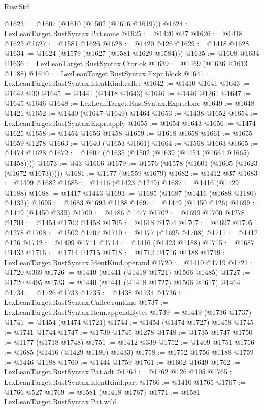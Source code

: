 \begin{lexlean}{RustStd}
\begin{coremodule}
@1623 := @1607 (@1610 (@1502 (@1616 @1619)))
@1624 := LexLeanTarget.RustSyntax.Pat.some
@1625 := @1420 @37
@1626 := @1418 @1625
@1627 := @1581 @1626
@1628 := @1420 @126
@1629 := @1418 @1628
@1634 := @1624 (@1579 (@1627 (@1581 @1629 @1584)))
@1635 := @1608 @1634
@1636 := LexLeanTarget.RustSyntax.Ctor.ok
@1639 := @1469 (@1636 @1613 @1188)
@1640 := LexLeanTarget.RustSyntax.Expr.block
@1641 := LexLeanTarget.RustSyntax.IdentKind.callee
@1642 := @1410 @1641
@1643 := @1642 @30
@1645 := @1441 (@1418 @1643)
@1646 := @1446 @1261
@1647 := @1645 @1646
@1648 := LexLeanTarget.RustSyntax.Expr.clone
@1649 := @1648 @1421
@1652 := @1440 (@1647 @1649) @1464
@1653 := @1438 @1652
@1654 := LexLeanTarget.RustSyntax.Expr.apply
@1655 := @1654 @1643
@1656 := @1474 @1625
@1658 := @1454 @1656 @1458
@1659 := @1618 @1658
@1661 := @1655 @1659 @1278
@1663 := @1640 (@1653 @1661)
@1664 := @1568 @1663
@1665 := @1474 @1628
@1672 := @1607 (@1635 (@1502 (@1639 (@1454 (@1664 @1665) @1458))))
@1673 := @43 @1606
@1679 := @1576 (@1578 (@1601 (@1605 (@1623 (@1672 @1673)))))
@1681 := @1177 (@1559 @1679)
@1682 := @1412 @37
@1683 := @1409 @1682
@1685 := @1416 (@1423 @1249)
@1687 := @1416 (@1429 @1188)
@1688 := @1417 @1443
@1693 := @1685 (@1687 (@1416 (@1688 @1180) @1433))
@1695 := @1683 @1693 @1188
@1697 := @1449 (@1450 @126)
@1699 := @1449 (@1450 @339)
@1700 := @1486 @1477
@1702 := @1699 @1700 @1278
@1704 := @1454 @1702 @1458
@1705 := @1618 @1704
@1707 := @1697 @1705 @1278
@1708 := @1502 @1707
@1710 := @1177 (@1695 @1708)
@1711 := @1412 @126
@1712 := @1409 @1711
@1714 := @1416 (@1423 @1188)
@1715 := @1687 @1433
@1716 := @1714 @1715
@1718 := @1712 @1716 @1188
@1719 := LexLeanTarget.RustSyntax.IdentKind.operand
@1720 := @1410 @1719
@1721 := @1720 @369
@1726 := @1440 (@1441 (@1418 @1721) @1566 @1485)
@1727 := @1720 @495
@1733 := @1440 (@1441 (@1418 @1727) @1566 @1617) @1464
@1734 := @1726 @1733
@1735 := @1438 @1734
@1736 := LexLeanTarget.RustSyntax.Callee.runtime
@1737 := LexLeanTarget.RustSyntax.Item.appendBytes
@1739 := @1449 (@1736 @1737)
@1741 := @1454 (@1474 @1721)
@1744 := @1454 (@1474 @1727) @1458
@1745 := @1741 @1744
@1747 := @1739 @1745 @1278
@1748 := @1735 @1747
@1750 := @1177 (@1718 @1748)
@1751 := @1412 @339
@1752 := @1409 @1751
@1756 := @1685 (@1416 (@1429 @1180) @1433)
@1758 := @1752 @1756 @1188
@1759 := @1446 @1188
@1760 := @1444 @1759
@1761 := @1602 @1649
@1762 := LexLeanTarget.RustSyntax.Pat.adt
@1764 := @1762 @126 @105
@1765 := LexLeanTarget.RustSyntax.IdentKind.part
@1766 := @1410 @1765
@1767 := @1766 @527
@1769 := @1581 (@1418 @1767)
@1771 := @1581 LexLeanTarget.RustSyntax.Pat.wild

\end{coremodule}
\end{lexlean}
